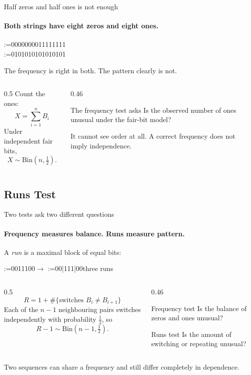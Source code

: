 \documentclass[11pt,aspectratio=169]{beamer}
\makeatletter
\newcommand{\Bin}{\mathrm{Bin}}
\newcommand{\bitstring}[1]{{\ttfamily\@tfor\bt:=#1\do{%
  \if\bt1\textcolor{primary}{1}\else\if\bt|\textcolor{muted}{\,|\,}\else\textcolor{muted}{0}\fi\fi}}}
\makeatother
\begin{document}
\begin{frame}{Half zeros and half ones is not enough}
  \framesubtitle{Both strings have eight zeros and eight ones.}
  \begin{center}
    {\LARGE\bitstring{0000000011111111}}\\[0.6ex]
    {\LARGE\bitstring{0101010101010101}}
  \end{center}
  The frequency is right in both. The pattern clearly is not.
  \smallskip
  \begin{columns}[T]
    \begin{column}{0.5\textwidth}
      Count the ones:
      \[X=\sum_{i=1}^{n}B_i\]
      Under independent fair bits,
      \[X\sim\Bin(n,\tfrac12).\]
    \end{column}
    \begin{column}{0.46\textwidth}
      \begin{block}{The frequency test asks}
        Is the observed number of ones unusual under the fair-bit model?
      \end{block}
      \medskip
      It cannot see order at all. A correct frequency does not imply
      independence.
    \end{column}
  \end{columns}
\end{frame}

\subsection{Runs Test}

\begin{frame}{Two tests ask two different questions}
  \framesubtitle{Frequency measures balance. Runs measure pattern.}
  A \emph{run} is a maximal block of equal bits:
  \begin{center}
    {\LARGE\bitstring{0011100}}\quad$\longrightarrow$\quad
    {\LARGE\bitstring{00|111|00}}\qquad three runs
  \end{center}
  \smallskip
  \begin{columns}[T]
    \begin{column}{0.5\textwidth}
      \[R=1+\#\{\text{switches }B_i\ne B_{i+1}\}\]
      Each of the $n-1$ neighbouring pairs switches independently with
      probability $\tfrac12$, so
      \[R-1\sim\Bin(n-1,\tfrac12).\]
    \end{column}
    \begin{column}{0.46\textwidth}
      \begin{block}{Frequency test}
        Is the balance of zeros and ones unusual?
      \end{block}
      \begin{block}{Runs test}
        Is the amount of switching or repeating unusual?
      \end{block}
    \end{column}
  \end{columns}
  \smallskip
  Two sequences can share a frequency and still differ completely in
  dependence.
\end{frame}
\end{document}

